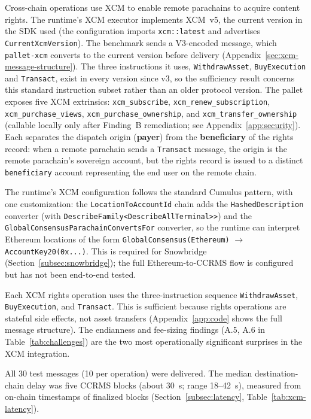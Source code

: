 Cross-chain operations use XCM to enable remote parachains to acquire content rights. The runtime's XCM executor implements XCM~v5, the current version in the SDK used (the configuration imports \texttt{xcm::latest} and advertises \texttt{CurrentXcmVersion}). The benchmark sends a V3-encoded message, which \texttt{pallet-xcm} converts to the current version before delivery (Appendix~\ref{sec:xcm-message-structure}). The three instructions it uses, \texttt{WithdrawAsset}, \texttt{BuyExecution} and \texttt{Transact}, exist in every version since v3, so the sufficiency result concerns this standard instruction subset rather than an older protocol version. The pallet exposes five XCM extrinsics: \texttt{xcm\_subscribe}, \texttt{xcm\_renew\_subscription}, \texttt{xcm\_purchase\_views}, \texttt{xcm\_purchase\_ownership}, and \texttt{xcm\_transfer\_ownership} (callable locally only after Finding~B remediation; see Appendix~\ref{app:security}). Each separates the dispatch origin (\textbf{payer}) from the \textbf{beneficiary} of the rights record: when a remote parachain sends a \texttt{Transact} message, the origin is the remote parachain's sovereign account, but the rights record is issued to a distinct \texttt{beneficiary} account representing the end user on the remote chain.

The runtime's XCM configuration follows the standard Cumulus pattern, with one customization: the \texttt{LocationToAccountId} chain adds the \texttt{HashedDescription} converter (with \texttt{DescribeFamily<\allowbreak DescribeAllTerminal>{}>}) and the \texttt{GlobalConsensus\allowbreak ParachainConvertsFor} converter, so the runtime can interpret Ethereum locations of the form \texttt{GlobalConsensus(Ethereum)} $\to$ \texttt{AccountKey20(0x...)}. This is required for Snowbridge (Section~\ref{subsec:snowbridge}); the full Ethereum-to-CCRMS flow is configured but has not been end-to-end tested.

Each XCM rights operation uses the three-instruction sequence \texttt{WithdrawAsset}, \texttt{BuyExecution}, and \texttt{Transact}. This is sufficient because rights operations are stateful side effects, not asset transfers (Appendix~\ref{app:code} shows the full message structure). The endianness and fee-sizing findings (A.5, A.6 in Table~\ref{tab:challenges}) are the two most operationally significant surprises in the XCM integration.

All 30 test messages (10 per operation) were delivered. The median destination-chain delay was five CCRMS blocks (about 30~s; range 18--42~s), measured from on-chain timestamps of finalized blocks (Section~\ref{subsec:latency}, Table~\ref{tab:xcm-latency}).

